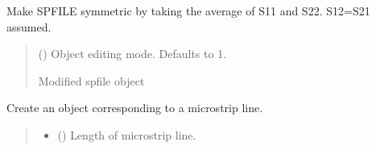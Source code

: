 \documentclass[letterpaper,10pt,english]{sphinxmanual}
\begin{document}
\begin{fulllineitems}
\begin{fulllineitems}
\end{fulllineitems}


\begin{fulllineitems}
\label{\detokenize{touchstone:touchstone.spfile.make_symmetric}}
\pysigstartsignatures
{}
\pysigstopsignatures
\sphinxAtStartPar
Make SPFILE symmetric by taking the average of S11 and S22. S12=S21 assumed.
\begin{quote}\begin{description}
\sphinxAtStartPar
{} (\sphinxstyleliteralemphasis{\sphinxupquote{, }}) \textendash{} Object editing mode. Defaults to \sphinxhyphen{}1.

\sphinxAtStartPar
Modified spfile object

\sphinxAtStartPar
{\hyperref[\detokenize{touchstone:touchstone.spfile}]{}}

\end{description}\end{quote}

\end{fulllineitems}


\begin{fulllineitems}
\label{\detokenize{touchstone:touchstone.spfile.microstripline}}
\pysigstartsignatures
{}
\pysigstopsignatures
\sphinxAtStartPar
Create an  object corresponding to a microstrip line.
\begin{quote}\begin{description}
\begin{itemize}
\item {}
\sphinxAtStartPar
{} () \textendash{} Length of microstrip line.


\end{itemize}
\end{description}
\end{quote}
\end{fulllineitems}
\end{fulllineitems}
\end{document}
